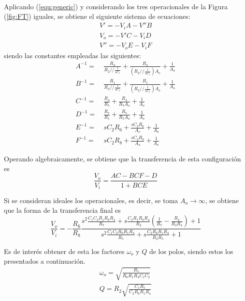 Aplicando (\ref{equ:generic}) y considerando los tres operacionales de la Figura (\ref{fig:FT}) iguales, se obtiene el siguiente sistema de ecuaciones:
\begin{equation}
\begin{split}
	V' = - V_i A - V'' B \\
	V_o = - V' C - V_i D \\
	V'' = - V_o E - V_i F
\end{split}
\end{equation}
siendo las constantes empleadas las siguientes:
\begin{equation}
\begin{split}
	A^{-1} =& \ \frac{R_3}{R_2 // \frac{1}{sC_1}} + \frac{R_3}{\left( R_2 // \frac{1}{sC_1} \right) A_o} + \frac{1}{A_o} \\
	B^{-1} =& \ \frac{R_1}{R_2 // \frac{1}{sC_1}} + \frac{R_1}{\left( R_2 // \frac{1}{sC_1} \right) A_o} + \frac{1}{A_o} \\
	C^{-1} =& \ \frac{R_4}{R_5} + \frac{R_4}{R_5 A_o} + \frac{1}{A_o} \\
	D^{-1} =& \ \frac{R_7}{R_5} + \frac{R_7}{R_5 A_o} + \frac{1}{A_o} \\
	E^{-1} =& \ sC_2R_6 + \frac{sC_2R_6}{A_o} + \frac{1}{A_o} \\
	F^{-1} =& \ sC_2R_8 + \frac{sC_2R_8}{A_o} + \frac{1}{A_o}
\end{split}
\end{equation}

Operando algebraicamente, se obtiene que la transferencia de esta configuración es
\begin{equation}
	\frac{V_o}{V_i} = \frac{AC - BCF - D}{1 + BCE}
	\label{equ:transf-ft-r}
\end{equation}

Si se consideran ideales los operacionales, es decir, se toma $A_o \rightarrow \infty$, se obtiene que la forma de la transferencia final es
\begin{equation}
	\frac{V_o}{V_i} = - \frac{R_6}{R_8} \frac{s^{2} \frac{C_1 C_2 R_1 R_8 R_4}{R_7} + s \frac{C_2 R_1 R_8 R_4}{R_2} \left( \frac{1}{R_7} - \frac{R_2}{R_3 R_4} \right) + 1}{s^{2} \frac{C_1 C_2 R_6 R_1 R_4}{R_5} + s \frac{C_2 R_6 R_1 R_4}{R_2 R_5} + 1}
\label{equ:transf-ft-i}
\end{equation}

Es de interés obtener de esta los factores $\omega_o$ y $Q$ de los polos, siendo estos los presentados a continuación.
\begin{equation}
\begin{split}
	\omega_o = \sqrt{\frac{R_5}{R_6 R_1 R_4 C_1 C_2}} \\
	Q = R_2 \sqrt{\frac{C_1 R_5}{C_2 R_6 R_1 R_4}} 
\end{split}
\label{equ:woq-ft}
\end{equation}

